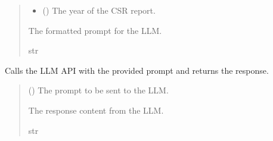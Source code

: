 \documentclass[letterpaper,10pt,english]{sphinxmanual}
\begin{document}
\begin{fulllineitems}
\begin{quote}
\begin{description}
\begin{itemize}
\item {} 
\sphinxAtStartPar
{} () \textendash{} The year of the CSR report.

\end{itemize}

\sphinxAtStartPar
The formatted prompt for the LLM.

\sphinxAtStartPar
str

\end{description}\end{quote}

\end{fulllineitems}


\begin{fulllineitems}
\label{\detokenize{modules.data_storage:modules.data_storage.llm_analyse.call_llm}}
\pysigstartsignatures
\pysiglinewithargsret
{}
{}
{}
\pysigstopsignatures
\sphinxAtStartPar
Calls the LLM API with the provided prompt and returns the response.
\begin{quote}\begin{description}
\sphinxAtStartPar
{} () \textendash{} The prompt to be sent to the LLM.

\sphinxAtStartPar
The response content from the LLM.

\sphinxAtStartPar
str

\end{description}\end{quote}

\end{fulllineitems}

\end{document}
